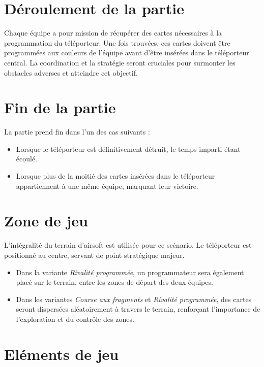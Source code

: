 \documentclass{template}
\begin{document}
\section{Déroulement de la partie}

Chaque équipe a pour mission de récupérer des cartes nécessaires à la programmation du téléporteur. Une fois trouvées, ces cartes doivent être programmées aux couleurs de l'équipe avant d'être insérées dans le téléporteur central. La coordination et la stratégie seront cruciales pour surmonter les obstacles adverses et atteindre cet objectif.

\section{Fin de la partie}

La partie prend fin dans l'un des cas suivants :
\begin{itemize}
    \item Lorsque le téléporteur est définitivement détruit, le temps imparti étant écoulé.
    \item Lorsque plus de la moitié des cartes insérées dans le téléporteur appartiennent à une même équipe, marquant leur victoire.
\end{itemize}

\section{Zone de jeu}

L'intégralité du terrain d'airsoft est utilisée pour ce scénario. Le téléporteur est positionné au centre, servant de point stratégique majeur.


\begin{itemize}
    \item Dans la variante \textit{Rivalité programmée}, un programmateur sera également placé sur le terrain, entre les zones de départ des deux équipes.
    \item Dans les variantes \textit{Course aux fragments} et \textit{Rivalité programmée}, des cartes seront dispersées aléatoirement à travers le terrain, renforçant l'importance de l'exploration et du contrôle des zones.
\end{itemize}

\section{Eléments de jeu}
\end{document}
